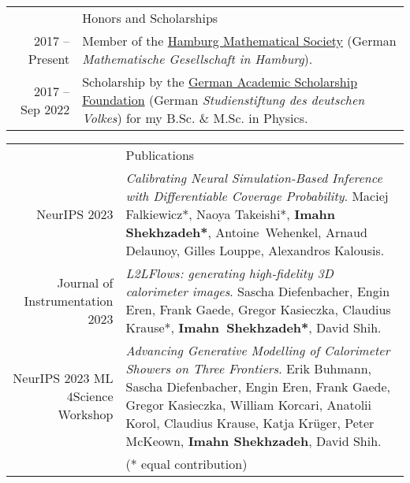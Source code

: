 \documentclass[11pt, a4paper]{article}
\newcommand{\headingfont}{\Large\color{OliveGreen}}
\newenvironment{SectionTable}[1]{
	\renewcommand*{\arraystretch}{1.7}
	\setlength{\tabcolsep}{10pt}
	\begin{longtable}{Rp{5.2in}} & #1 \\}
	{\end{longtable}\vspace{-.3cm}}
\newenvironment{SectionTableSingleSpace}[1]{
	\renewcommand*{\arraystretch}{1.2}
	\setlength{\tabcolsep}{10pt}
	\begin{longtable}{Rp{5.2in}} & #1 \\[0.6em]}
	{\end{longtable}\vspace{-.3cm}}
\begin{document}
	
	\begin{SectionTableSingleSpace}{\headingfont Honors and Scholarships}
		2017 -- Present & 
		Member of the \href{https://www.mathges.hamburg/Veranstaltungen.html}{Hamburg Mathematical Society} (German \textit{Mathematische Gesellschaft in Hamburg}). \\ 
		
		2017 -- Sep 2022 & 
		Scholarship by the \href{https://www.studienstiftung.de/en/}{German Academic Scholarship Foundation} (German \textit{\mbox{Studienstiftung} des deutschen Volkes}) 
        for my B.Sc. \& M.Sc. in Physics. %
	\end{SectionTableSingleSpace}
	
	\begin{SectionTable}{\headingfont Publications} 
        NeurIPS 2023 & \textit{Calibrating Neural Simulation-Based Inference with Differentiable Coverage Probability}. 
        Maciej Falkiewicz*, Naoya Takeishi*, \textbf{Imahn Shekhzadeh*}, \mbox{Antoine Wehenkel}, Arnaud Delaunoy, Gilles Louppe, 
        Alexandros Kalousis. \\

        Journal of \mbox{Instrumentation} 2023 & \textit{L2LFlows: generating high-fidelity 3D calorimeter images}.
        Sascha Diefenbacher, Engin Eren, Frank Gaede, Gregor Kasieczka, Claudius Krause*, \mbox{\textbf{Imahn Shekhzadeh*}}, David Shih. \\

        NeurIPS 2023 ML$4$Science Workshop & \textit{Advancing Generative Modelling of Calorimeter Showers on Three Frontiers}.
        Erik Buhmann, Sascha Diefenbacher, Engin Eren, Frank Gaede, Gregor Kasieczka, William Korcari, Anatolii Korol, 
        Claudius Krause, Katja Krüger, Peter McKeown, \textbf{Imahn Shekhzadeh}, David Shih. \\[18pt]

        & \small (* equal contribution) \normalsize
        
	\end{SectionTable}
	
\end{document}
